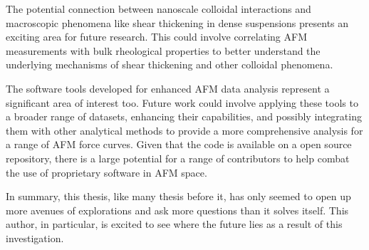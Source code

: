The potential connection between nanoscale colloidal interactions and macroscopic phenomena like shear thickening in dense suspensions presents an exciting area for future research. This could involve correlating AFM measurements with bulk rheological properties to better understand the underlying mechanisms of shear thickening and other colloidal phenomena.

The software tools developed for enhanced AFM data analysis represent a significant area of interest too. Future work could involve applying these tools to a broader range of datasets, enhancing their capabilities, and possibly integrating them with other analytical methods to provide a more comprehensive analysis for a range of AFM force curves. Given that the code is available on a open source repository, there is a large potential for a range of contributors to help combat the use of proprietary software in AFM space.

In summary, this thesis, like many thesis before it, has only seemed to open up more avenues of explorations and ask more questions than it solves itself. This author, in particular, is excited to see where the future lies as a result of this investigation.
